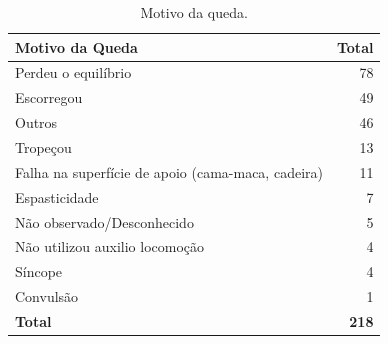 \documentclass[
  a4paper]{article}
\begin{document}
\begin{table}[H]

\caption{\label{tab:unnamed-chunk-8}Dano decorrente da queda (evento adverso)}
\centering
{}
\end{table}

\begin{table}[H]

\caption{\label{tab:unnamed-chunk-9}Motivo da queda.}
\centering
\begin{tabular}[t]{lr}
\toprule
Motivo da Queda & Total\\
\midrule
Perdeu o equilíbrio & 78\\
Escorregou & 49\\
Outros & 46\\
Tropeçou & 13\\
Falha na superfície de apoio (cama-maca, cadeira) & 11\\
\addlinespace
Espasticidade & 7\\
Não observado/Desconhecido & 5\\
Não utilizou auxilio locomoção & 4\\
Síncope & 4\\
Convulsão & 1\\
\midrule
\addlinespace
\textbf{Total} & \textbf{218}\\
\bottomrule
\end{tabular}
\end{table}
\end{document}
